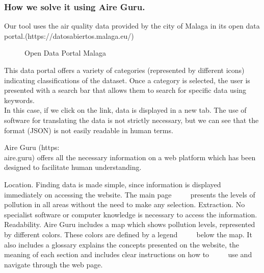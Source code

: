 \subsubsection{How we solve it using Aire Guru.} 

Our tool uses the air quality data provided by the city of Malaga in its open data portal.(https://datosabiertos.malaga.eu/)\\
\begin{figure}[ht]
    \centering
    \hfill




    \vfill
  
  \caption{Open Data Portal Malaga}
    \end{figure}

    This data portal offers a variety of categories (represented by different icons) indicating classifications of the dataset.
    Once a category is selected, the user is presented with a search bar that allows them to search for specific data using keywords.\\
    
    In this case, if we click on the link, data is displayed in a new tab. The use of software
    for translating the data is not strictly necessary, but we can see that the format (JSON) is not easily readable in human terms.

Aire Guru (https:\\aire.guru) offers all the necessary information on a web platform which has been designed to facilitate human understanding.


\begin{itemize}
    \done Location. Finding data is made simple, since information is displayed immediately on accessing the website. The main page
         presents the levels of pollution in all areas without the need to make any selection.
    \done Extraction. No specialist software or computer knowledge is necessary to access the information.
    \done Readability. Aire Guru includes a map which shows pollution levels, represented by different colors. These colors are defined by a legend
         below the map. It also includes a glossary explains the concepts presented on the website, the meaning of each section and includes clear instructions on how to
         use and navigate through the web page.
 

\end{itemize}
\newpage

 


